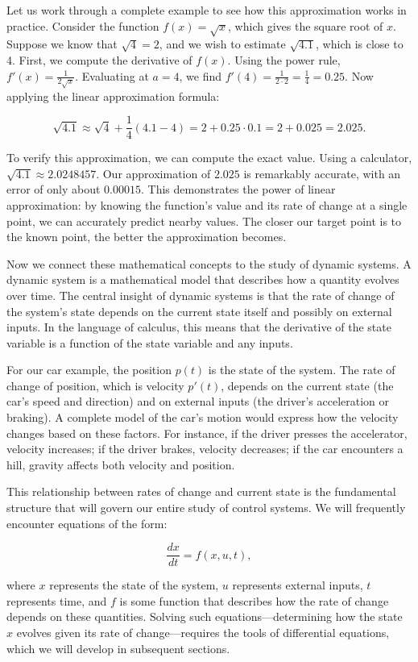 Let us work through a complete example to see how this approximation works in practice. Consider the function $f(x) = \sqrt{x}$, which gives the square root of $x$. Suppose we know that $\sqrt{4} = 2$, and we wish to estimate $\sqrt{4.1}$, which is close to 4. First, we compute the derivative of $f(x)$. Using the power rule, $f'(x) = \frac{1}{2\sqrt{x}}$. Evaluating at $a = 4$, we find $f'(4) = \frac{1}{2 \cdot 2} = \frac{1}{4} = 0.25$. Now applying the linear approximation formula:

\[
\sqrt{4.1} \approx \sqrt{4} + \frac{1}{4}(4.1 - 4) = 2 + 0.25 \cdot 0.1 = 2 + 0.025 = 2.025.
\]

To verify this approximation, we can compute the exact value. Using a calculator, $\sqrt{4.1} \approx 2.0248457$. Our approximation of $2.025$ is remarkably accurate, with an error of only about $0.00015$. This demonstrates the power of linear approximation: by knowing the function's value and its rate of change at a single point, we can accurately predict nearby values. The closer our target point is to the known point, the better the approximation becomes.

Now we connect these mathematical concepts to the study of dynamic systems. A dynamic system is a mathematical model that describes how a quantity evolves over time. The central insight of dynamic systems is that the rate of change of the system's state depends on the current state itself and possibly on external inputs. In the language of calculus, this means that the derivative of the state variable is a function of the state variable and any inputs.

For our car example, the position $p(t)$ is the state of the system. The rate of change of position, which is velocity $p'(t)$, depends on the current state (the car's speed and direction) and on external inputs (the driver's acceleration or braking). A complete model of the car's motion would express how the velocity changes based on these factors. For instance, if the driver presses the accelerator, velocity increases; if the driver brakes, velocity decreases; if the car encounters a hill, gravity affects both velocity and position.

This relationship between rates of change and current state is the fundamental structure that will govern our entire study of control systems. We will frequently encounter equations of the form:

\[
\frac{dx}{dt} = f(x, u, t),
\]

where $x$ represents the state of the system, $u$ represents external inputs, $t$ represents time, and $f$ is some function that describes how the rate of change depends on these quantities. Solving such equations—determining how the state $x$ evolves given its rate of change—requires the tools of differential equations, which we will develop in subsequent sections.

